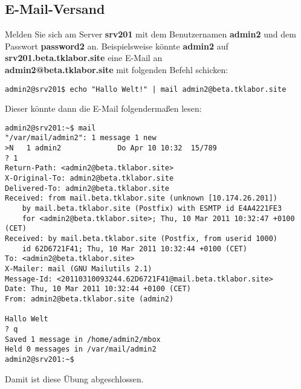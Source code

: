 \subsection{E-Mail-Versand}
Melden Sie sich am Server \textbf{srv201} mit dem Benutzernamen \textbf{admin2}
und dem Passwort \textbf{password2} an. Beispielsweise könnte \textbf{admin2}
auf
\\
\textbf{srv201.beta.tklabor.site} eine E-Mail an \\
\textbf{admin2@beta.tklabor.site} mit folgenden Befehl schicken:

\begin{lstlisting}
admin2@srv201$ echo "Hallo Welt!" | mail admin2@beta.tklabor.site
\end{lstlisting}

Dieser könnte dann die E-Mail folgendermaßen lesen:
\begin{scriptsize}
\begin{lstlisting}
admin2@srv201:~$ mail
"/var/mail/admin2": 1 message 1 new
>N   1 admin2             Do Apr 10 10:32  15/789   
? 1
Return-Path: <admin2@beta.tklabor.site>
X-Original-To: admin2@beta.tklabor.site
Delivered-To: admin2@beta.tklabor.site
Received: from mail.beta.tklabor.site (unknown [10.174.26.201])
	by mail.beta.tklabor.site (Postfix) with ESMTP id E4A4221FE3
	for <admin2@beta.tklabor.site>; Thu, 10 Mar 2011 10:32:47 +0100 (CET)
Received: by mail.beta.tklabor.site (Postfix, from userid 1000)
	id 62D6721F41; Thu, 10 Mar 2011 10:32:44 +0100 (CET)
To: <admin2@beta.tklabor.site>
X-Mailer: mail (GNU Mailutils 2.1)
Message-Id: <20110310093244.62D6721F41@mail.beta.tklabor.site>
Date: Thu, 10 Mar 2011 10:32:44 +0100 (CET)
From: admin2@beta.tklabor.site (admin2)

Hallo Welt
? q
Saved 1 message in /home/admin2/mbox
Held 0 messages in /var/mail/admin2
admin2@srv201:~$ 
\end{lstlisting}
\end{scriptsize}
Damit ist diese Übung abgeschlossen.
